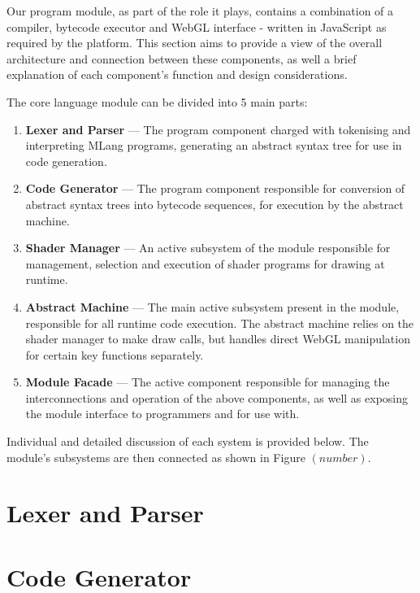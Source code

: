 \documentclass{l3proj}
\begin{document}
Our program module, as part of the role it plays, contains a combination of a compiler, bytecode executor and WebGL interface - written in JavaScript as required by the platform. This section aims to provide a view of the overall architecture and connection between these components, as well a brief explanation of each component's function and design considerations.

The core language module can be divided into 5 main parts:\begin{enumerate}
\item \textbf{Lexer and Parser} --- The program component charged with tokenising and interpreting MLang programs, generating an abstract syntax tree for use in code generation.
\item \textbf{Code Generator} --- The program component responsible for conversion of abstract syntax trees into bytecode sequences, for execution by the abstract machine.
\item \textbf{Shader Manager} --- An active subsystem of the module responsible for management, selection and execution of shader programs for drawing at runtime.
\item \textbf{Abstract Machine} --- The main active subsystem present in the module, responsible for all runtime code execution. The abstract machine relies on the shader manager to make draw calls, but handles direct WebGL manipulation for certain key functions separately.
\item \textbf{Module Facade} --- The active component responsible for managing the interconnections and operation of the above components, as well as exposing the module interface to programmers and for use with.
\end{enumerate}
Individual and detailed discussion of each system is provided below. The module's subsystems are then connected as shown in Figure $(\left. number\right.) $.

\section{Lexer and Parser}
\label{arch-lex}

\section{Code Generator}
\label{arch-gen}
\end{document}
